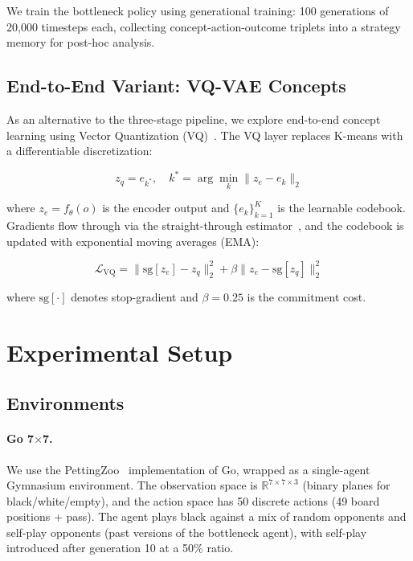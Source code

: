\documentclass[11pt,a4paper]{article}
\newcommand{\encoder}{f_\theta}
\begin{document}
We train the bottleneck policy using generational training: 100 generations of 20,000 timesteps each, collecting concept-action-outcome triplets into a strategy memory for post-hoc analysis.

\subsection{End-to-End Variant: VQ-VAE Concepts}

As an alternative to the three-stage pipeline, we explore end-to-end concept learning using Vector Quantization (VQ)~\citep{van2017neural}. The VQ layer replaces K-means with a differentiable discretization:

\begin{equation}
    z_q = e_{k^*}, \quad k^* = \arg\min_k \| z_e - e_k \|_2
\end{equation}

where $z_e = \encoder(o)$ is the encoder output and $\{e_k\}_{k=1}^K$ is the learnable codebook. Gradients flow through via the straight-through estimator~\citep{bengio2013estimating}, and the codebook is updated with exponential moving averages (EMA):

\begin{equation}
    \mathcal{L}_{\text{VQ}} = \| \text{sg}[z_e] - z_q \|_2^2 + \beta \| z_e - \text{sg}[z_q] \|_2^2
\end{equation}

where $\text{sg}[\cdot]$ denotes stop-gradient and $\beta = 0.25$ is the commitment cost.

\section{Experimental Setup}

\subsection{Environments}

\paragraph{Go 7$\times$7.}
We use the PettingZoo~\citep{terry2021pettingzoo} implementation of Go, wrapped as a single-agent Gymnasium environment. The observation space is $\mathbb{R}^{7 \times 7 \times 3}$ (binary planes for black/white/empty), and the action space has 50 discrete actions (49 board positions + pass). The agent plays black against a mix of random opponents and self-play opponents (past versions of the bottleneck agent), with self-play introduced after generation 10 at a 50\% ratio.
\end{document}
